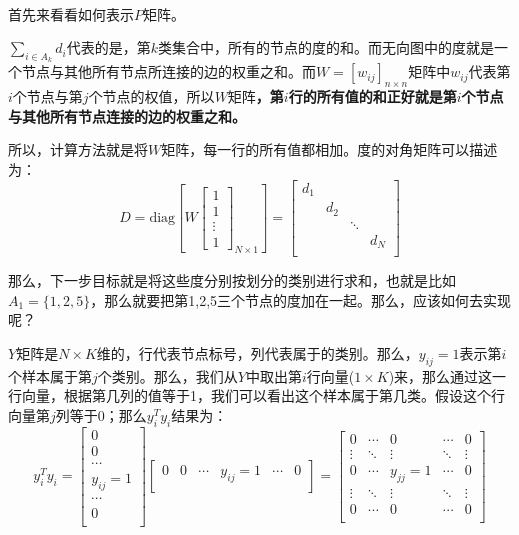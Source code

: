 \documentclass[a4paper]{article}
\begin{document}
~\\

首先来看看如何表示$P$矩阵。

$\sum_{i\in A_k} d_i $代表的是，第$k$类集合中，所有的节点的度的和。而无向图中的度就是一个节点与其他所有节点所连接的边的权重之和。而$W=[w_{ij}]_{n\times n}$矩阵中$w_{ij}$代表第$i$个节点与第$j$个节点的权值，所以$W$矩阵\textbf{，第$i$行的所有值的和正好就是第$i$个节点与其他所有节点连接的边的权重之和。}

所以，计算方法就是将$W$矩阵，每一行的所有值都相加。度的对角矩阵可以描述为：
\begin{equation}
    D = \mathrm{diag}\left[W
    \begin{bmatrix}
    1 \\ 1 \\ \vdots \\ 1 
    \end{bmatrix}_{N\times 1}\right]
    = \begin{bmatrix}
    d_1 & & & \\
     & d_2 & & \\
     & & \ddots & \\
     & & & d_N \\
    \end{bmatrix}
\end{equation}


那么，下一步目标就是将这些度分别按划分的类别进行求和，也就是比如$A_1=\{1,2,5\}$，那么就要把第1,2,5三个节点的度加在一起。那么，应该如何去实现呢？

$Y$矩阵是$N\times K$维的，行代表节点标号，列代表属于的类别。那么，$y_{ij} = 1$表示第$i$个样本属于第$j$个类别。那么，我们从$Y$中取出第$i$行向量($1\times K$)来，那么通过这一行向量，根据第几列的值等于1，我们可以看出这个样本属于第几类。假设这个行向量第$j$列等于0；那么$y_i^Ty_i$结果为：
\begin{equation}
y_i^Ty_i=  
    \begin{bmatrix}
    0 \\ 0\\ \cdots\\y_{ij}=1\\ \cdots\\0 \\
    \end{bmatrix}
     \begin{bmatrix}
    0 & 0& \cdots&y_{ij}=1&\cdots&0 \\
    \end{bmatrix}
    =
    \begin{bmatrix}
    0 & \cdots & 0 &\cdots & 0 \\
    \vdots & \ddots & \vdots &\ddots & \vdots \\
     0 & \cdots & y_{jj}=1 &\cdots & 0 \\
     \vdots & \ddots & \vdots &\ddots & \vdots \\
     0 & \cdots & 0 &\cdots & 0 \\
    \end{bmatrix}
\end{equation}
\end{document}
